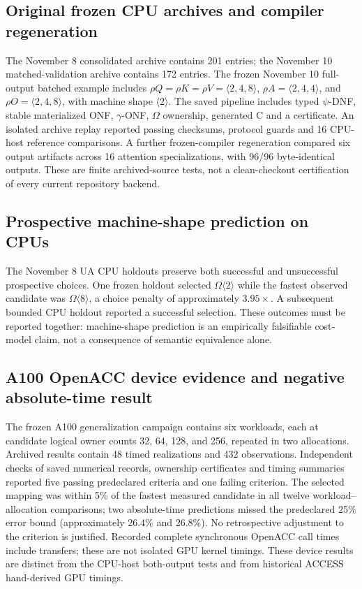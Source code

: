 \documentclass[11pt]{article}
\begin{document}
\subsection{Original frozen CPU archives and compiler regeneration}
The November 8 consolidated archive contains 201 entries; the November 10 matched-validation archive contains 172 entries. The frozen November 10 full-output batched example includes $\rho Q=\rho K=\rho V=\langle2,4,8\rangle$, $\rho A=\langle2,4,4\rangle$, and $\rho O=\langle2,4,8\rangle$, with machine shape $\langle2\rangle$. The saved pipeline includes typed $\psi$-DNF, stable materialized ONF, $\gamma$-ONF, $\Omega$ ownership, generated C and a certificate. An isolated archive replay reported passing checksums, protocol guards and 16 CPU-host reference comparisons. A further frozen-compiler regeneration compared six output artifacts across 16 attention specializations, with 96/96 byte-identical outputs. These are finite archived-source tests, not a clean-checkout certification of every current repository backend.

\subsection{Prospective machine-shape prediction on CPUs}
The November 8 UA CPU holdouts preserve both successful and unsuccessful prospective choices. One frozen holdout selected $\Omega\langle2\rangle$ while the fastest observed candidate was $\Omega\langle8\rangle$, a choice penalty of approximately $3.95\times$. A subsequent bounded CPU holdout reported a successful selection. These outcomes must be reported together: machine-shape prediction is an empirically falsifiable cost-model claim, not a consequence of semantic equivalence alone.

\subsection{A100 OpenACC device evidence and negative absolute-time result}
The frozen A100 generalization campaign contains six workloads, each at candidate logical owner counts 32, 64, 128, and 256, repeated in two allocations. Archived results contain 48 timed realizations and 432 observations. Independent checks of saved numerical records, ownership certificates and timing summaries reported five passing predeclared criteria and one failing criterion. The selected mapping was within 5\% of the fastest measured candidate in all twelve workload--allocation comparisons; two absolute-time predictions missed the predeclared 25\% error bound (approximately 26.4\% and 26.8\%). No retrospective adjustment to the criterion is justified. Recorded complete synchronous OpenACC call times include transfers; these are not isolated GPU kernel timings. These device results are distinct from the CPU-host both-output tests and from historical ACCESS hand-derived GPU timings.
\end{document}
